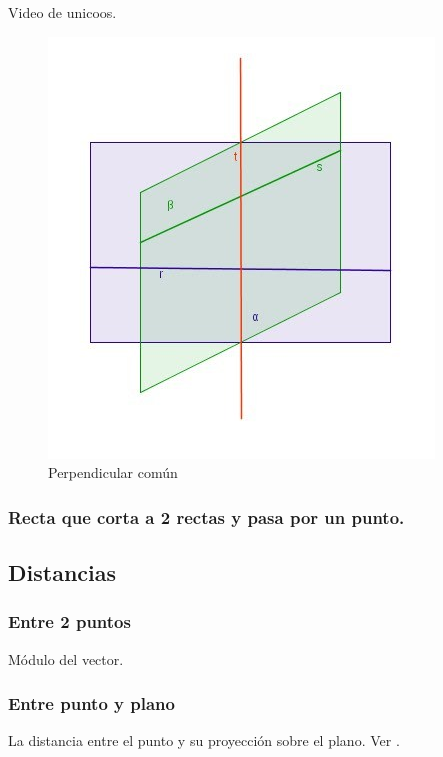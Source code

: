 \begin{problem}
Video de unicoos.
\solution

\end{problem}


\begin{figure}[H]
\centering
\includegraphics[scale=0.7]{img/PerpendicularComun.jpg}
\caption{Perpendicular común}
\label{fig::Perpendicularcomun}
\end{figure}

\subsubsection{Recta que corta a 2 rectas y pasa por un punto.}



\subsection{Distancias}
\subsubsection{Entre 2 puntos}
Módulo del vector.

\subsubsection{Entre punto y plano}

La distancia entre el punto y su proyección sobre el plano. Ver .


